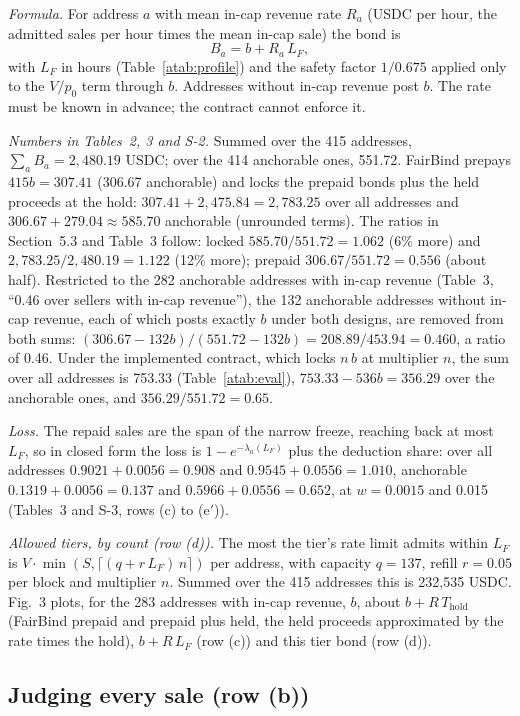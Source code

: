 \documentclass[10pt,a4paper]{article}
\newcommand{\Thold}{T_{\mathrm{hold}}}
\theoremstyle{plain}
\theoremstyle{remark}
\begin{document}
\emph{Formula.} For address $a$ with mean in-cap revenue rate $R_a$ (USDC per hour, the admitted sales per hour times the mean in-cap sale) the bond is
\[
B_a=b+R_a\,L_F ,
\]
with $L_F$ in hours (Table~\ref{atab:profile}) and the safety factor $1/0.675$ applied only to the $V/p_0$ term through $b$. Addresses without in-cap revenue post $b$. The rate must be known in advance; the contract cannot enforce it.

\emph{Numbers in Tables~2, 3 and S-2.} Summed over the 415 addresses, $\sum_aB_a=2{,}480.19$ USDC; over the 414 anchorable ones, 551.72. FairBind prepays $415b=307.41$ (306.67 anchorable) and locks the prepaid bonds plus the held proceeds at the hold: $307.41+2{,}475.84=2{,}783.25$ over all addresses and $306.67+279.04\approx585.70$ anchorable (unrounded terms). The ratios in Section~5.3 and Table~3 follow: locked $585.70/551.72=1.062$ (6\% more) and $2{,}783.25/2{,}480.19=1.122$ (12\% more); prepaid $306.67/551.72=0.556$ (about half). Restricted to the 282 anchorable addresses with in-cap revenue (Table~3, ``0.46 over sellers with in-cap revenue''), the 132 anchorable addresses without in-cap revenue, each of which posts exactly $b$ under both designs, are removed from both sums: $(306.67-132b)/(551.72-132b)=208.89/453.94=0.460$, a ratio of 0.46. Under the implemented contract, which locks $n\,b$ at multiplier $n$, the sum over all addresses is 753.33 (Table~\ref{atab:eval}), $753.33-536b=356.29$ over the anchorable ones, and $356.29/551.72=0.65$.

\emph{Loss.} The repaid sales are the span of the narrow freeze, reaching back at most $L_F$, so in closed form the loss is $1-e^{-\lambda_a(L_F)}$ plus the deduction share: over all addresses $0.9021+0.0056=0.908$ and $0.9545+0.0556=1.010$, anchorable $0.1319+0.0056=0.137$ and $0.5966+0.0556=0.652$, at $w=0.0015$ and 0.015 (Tables~3 and S-3, rows (c) to (e$'$)).

\emph{Allowed tiers, by count (row (d)).} The most the tier's rate limit admits within $L_F$ is $V\cdot\min(S,\lceil(q+r\,L_F)\,n\rceil)$ per address, with capacity $q=137$, refill $r=0.05$ per block and multiplier $n$. Summed over the 415 addresses this is 232,535 USDC. Fig.~3 plots, for the 283 addresses with in-cap revenue, $b$, about $b+R\,\Thold$ (FairBind prepaid and prepaid plus held, the held proceeds approximated by the rate times the hold), $b+R\,L_F$ (row (c)) and this tier bond (row (d)).

\subsection{Judging every sale (row (b))}
\end{document}
